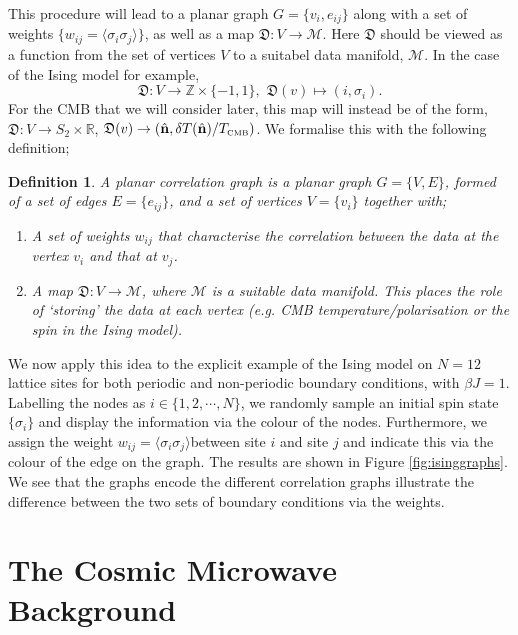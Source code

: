 \documentclass[11pt]{article}
\numberwithin{equation}{section}
\numberwithin{figure}{section}
\numberwithin{table}{section}
\newtheorem{definition}{Definition}
\numberwithin{definition}{section}
\begin{document}
This procedure will lead to a planar graph $G = \{v_i, e_{ij}\}$ along with a set of weights $\{w_{ij} = \langle \sigma_i \sigma_j \rangle \}$, as well as a map $\mathfrak{D}: V \rightarrow \mathcal{M}$. Here $\mathfrak{D}$ should be viewed as a function from the set of vertices $V$ to a suitabel data manifold, $\mathcal{M}$. In the case of the Ising model for example,
\begin{equation}
\mathfrak{D}: V \rightarrow \mathbb{Z} \times \{-1, 1\}, \,\, \mathfrak{D}(v) \mapsto (i, \sigma_i).
\end{equation}
For the CMB that we will consider later, this map will instead be of the form, $\mathfrak{D}: V \rightarrow S_2 \times \mathbb{R}$, $\mathfrak{D}(v) \rightarrow \left(\hat{\mathbf{n}}, \delta T(\hat{\mathbf{n}})/T_{\textrm{\tiny CMB}}\right)$. We formalise this with the following definition;
\begin{definition}
A \textit{planar correlation graph} is a planar graph $G = \{V, E\}$, formed of a set of edges $E = \{e_{ij}\}$, and a set of vertices $V = \{v_i\}$ together with;
\begin{enumerate}
\item A set of weights $w_{ij}$ that characterise the correlation between the data at the vertex $v_i$ and that at $v_j$.
\item A map $\mathfrak{D}: V \rightarrow \mathcal{M}$, where $\mathcal{M}$ is a suitable data manifold. This places the role of `storing' the data at each vertex (e.g. CMB temperature/polarisation or the spin in the Ising model).
\end{enumerate} 
\end{definition}

We now apply this idea to the explicit example of the Ising model on $N = 12$ lattice sites for both periodic and non-periodic boundary conditions, with $\beta J = 1$. Labelling the nodes as $i \in \{1, 2, \cdots, N\}$, we randomly sample an initial spin state $\{\sigma_i\}$ and display the information via the colour of the nodes. Furthermore, we assign the weight $w_{ij} = \langle \sigma_i \sigma_j \rangle$between site $i$ and site $j$ and indicate this via the colour of the edge on the graph. The results are shown in Figure \ref{fig:isinggraphs}. We see that the graphs encode the different correlation graphs illustrate the difference between the two sets of boundary conditions via the weights.



\section{The Cosmic Microwave Background}
\end{document}
